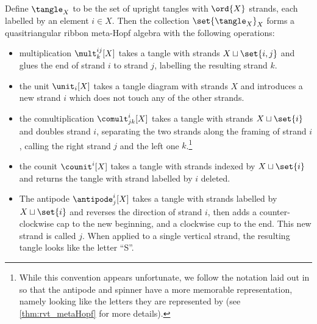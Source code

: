 \begin{theorem}
        \label{thm:tangles_meta_algebra}
        Define $\tangle_X$ to be the set of upright tangles with $\ord{X}$
        strands, each labelled by an element $i\in X$. Then the collection
        $\set{\tangle_X}_X$ forms a quasitriangular ribbon meta-Hopf algebra
        with the following operations:
        \begin{itemize}
                \item multiplication $\mult^{ij}_{k}[X]$ takes a tangle with
                        strands $X\sqcup\set{i,j}$ and glues the end of strand
                        $i$ to strand $j$, labelling the resulting strand $k$.
                \item the unit $\unit_{i}[X]$ takes a tangle diagram with
                        strands $X$ and introduces a new strand $i$ which does
                        not touch any of the other strands.
                \item the comultiplication $\comult^{i}_{jk}[X]$ takes a tangle
                        with strands $X\sqcup \set{i}$ and doubles strand $i$,
                        separating the two strands along the framing of strand
                        $i$, calling the right strand $j$ and the left one
                        $k$.\footnote{While this convention appears unfortunate,
                        we follow the notation laid out in \cite{BV} so that the
                        antipode and spinner have a more memorable
                        representation, namely looking like the letters they are
                        represented by (see \cref{thm:rvt_metaHopf} for more
                        details).
                }
                \item the counit $\counit^{i}[X]$ takes a tangle with strands
                        indexed by $X\sqcup \set{i}$ and returns the tangle with
                        strand labelled by $i$ deleted.
                \item The antipode $\antipode^{i}_{j}[X]$ takes a tangle with
                        strands labelled by $X \sqcup \set{i}$ and reverses the
                        direction of strand $i$, then adds a counter-clockwise
                        cap to the new beginning, and a clockwise cup to the
                        end. This new strand is called $j$. When applied to a
                        single vertical strand, the resulting tangle looks like
                        the letter \enquote{S}.

\end{itemize}
\end{theorem}
